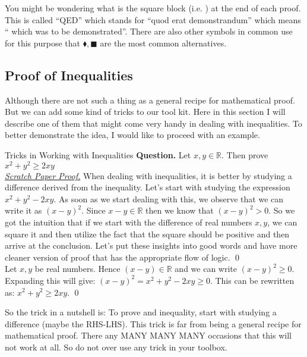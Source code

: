 You might be wondering what is the square block (i.e. \qedsymbol) at the end of each proof. This is called ``QED'' which stands for ``quod erat demonstrandum'' which means `` which was to be demonstrated''. There are also other symbols in common use for this purpose that $ \blacklozenge, \blacksquare $ are the most common alternatives.


\subsection{Proof of Inequalities}
Although there are not such a thing as a general recipe for mathematical proof. But we can add some kind of tricks to our tool kit. Here in this section I will describe one of them that might come very handy in dealing with inequalities. To better demonstrate the idea, I would like to proceed with an example.

\begin{example}{Tricks in Working with Inequalities}
	\textbf{Question.} Let $ x,y \in \mathbb{R}$. Then prove $x^2 + y^2 \geq 2xy$ \\
	
	\underline{\emph{Scratch Paper Proof.}} When dealing with inequalities, it is better by studying a difference derived from the inequality. Let's start with studying the expression $ x^2 + y^2 - 2xy $. As soon as we start dealing with this, we observe that we can write it as $ (x-y)^2 $. Since $ x-y \in \mathbb{R} $ then we know that $ (x-y)^2 >0 $. So we got the intuition that if we start with the difference of real numbers $ x,y $, we can square it and then utilize the fact that the square should be positive and then arrive at the conclusion. Let's put these insights into good words and have more cleaner version of proof that has the appropriate flow of logic. \qed \\
	
	 Let $ x,y $ be real numbers. Hence $ (x-y) \in \mathbb{R} $ and we can write $ (x-y)^2 \geq 0 $. Expanding this will give: $ (x-y)^2 = x^2 + y^2 -2xy \geq 0 $. This can be rewritten as: $ x^2 + y^2 \geq 2xy $. \qed
	
\end{example}

So the trick in a nutshell is: To prove and inequality, start with studying a difference (maybe the RHS-LHS). This trick is far from being a general recipe for mathematical proof. There any MANY MANY MANY occasions that this will not work at all. So do not over use any trick in your toolbox.

